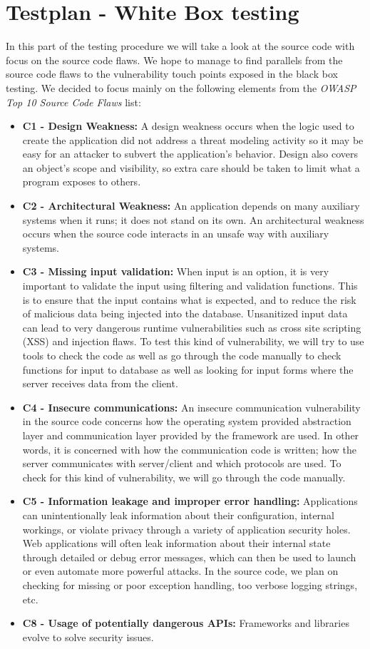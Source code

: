 \clearpage
\section{Testplan - White Box testing}
In this part of the testing procedure we will take a look at the source code with focus on the source code flaws. We hope to manage to find parallels from the source code flaws to the vulnerability touch points exposed in the black box testing. We decided to focus mainly on the following elements from the {\it OWASP Top 10 Source Code Flaws} list: 

\begin{itemize}
	\item {\bf C1 - Design Weakness:} A design weakness occurs when the logic used to create the application did not address a threat modeling activity so it may be easy for an attacker to subvert the application's behavior. Design also covers an object's scope and visibility, so extra care should be taken to limit what a program exposes to others.
	\item {\bf C2 - Architectural Weakness:} An application depends on many auxiliary systems when it runs; it does not stand on its own. An architectural weakness occurs when the source code interacts in an unsafe way with auxiliary systems.
	\item {\bf C3 - Missing input validation:} When input is an option, it is very important to validate the input using filtering and validation functions. This is to ensure that the input contains what is expected, and to reduce the risk of malicious data being injected into the database. Unsanitized input data can lead to very dangerous runtime vulnerabilities such as cross site scripting (XSS) and injection flaws. To test this kind of vulnerability, we will try to use tools to check the code as well as go through the code manually to check functions for input to database as well as looking for input forms where the server receives data from the client.
	\item {\bf C4 - Insecure communications:} An insecure communication vulnerability in the source code concerns how the operating system provided abstraction layer and communication layer provided by the framework are used. In other words, it is concerned with how the communication code is written; how the server communicates with server/client and which protocols are used. To check for this kind of vulnerability, we will go through the code manually.
	\item {\bf C5 - Information leakage and improper error handling:} Applications can unintentionally leak information about their configuration, internal workings, or violate privacy through a variety of application security holes. Web applications will often leak information about their internal state through detailed or debug error messages, which can then be used to launch or even automate more powerful attacks. In the source code, we plan on checking for missing or poor exception handling, too verbose logging strings, etc.
	\item {\bf C8 - Usage of potentially dangerous APIs:} Frameworks and libraries evolve to solve security issues.
\end{itemize}


